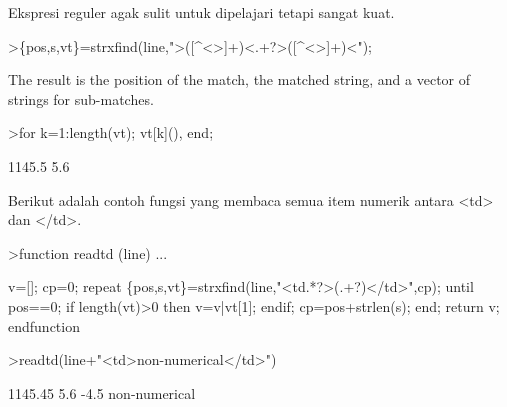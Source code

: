 \documentclass[12pt,arial,letterpaper]{book}
\begin{document}
\begin{eulercomment}
\begin{eulercomment}
\begin{eulercomment}
\begin{eulercomment}
\begin{eulercomment}
\begin{eulercomment}
\begin{eulercomment}
\begin{eulercomment}
\begin{eulercomment}
\begin{eulercomment}
\begin{eulercomment}
\begin{eulercomment}
\begin{eulercomment}
\begin{eulercomment}
\begin{eulercomment}
\begin{eulercomment}
\begin{eulercomment}
\begin{eulercomment}
\begin{eulercomment}
\begin{eulercomment}
\begin{eulercomment}
\begin{eulercomment}
\begin{eulercomment}
\begin{eulercomment}
\begin{eulercomment}
\begin{eulercomment}
\begin{eulercomment}
\begin{eulercomment}
\begin{eulercomment}
\begin{eulercomment}
\begin{eulercomment}
\begin{eulercomment}
\begin{eulercomment}
\begin{eulercomment}
\begin{eulercomment}
\begin{eulercomment}
\begin{eulercomment}
\begin{eulercomment}
\begin{eulercomment}
Ekspresi reguler agak sulit untuk dipelajari tetapi sangat kuat.
\end{eulercomment}
\begin{eulerprompt}
>\{pos,s,vt\}=strxfind(line,">([^<>]+)<.+?>([^<>]+)<");
\end{eulerprompt}
\begin{eulercomment}
The result is the position of the match, the matched string, and a
vector of strings for sub-matches.
\end{eulercomment}
\begin{eulerprompt}
>for k=1:length(vt); vt[k](), end;
\end{eulerprompt}
\begin{euleroutput}
  1145.5
  5.6
\end{euleroutput}
\begin{eulercomment}
Berikut adalah contoh fungsi yang membaca semua item numerik antara
\textless{}td\textgreater{} dan \textless{}/td\textgreater{}.
\end{eulercomment}
\begin{eulerprompt}
>function readtd (line) ...
\end{eulerprompt}
\begin{eulerudf}
  v=[]; cp=0;
  repeat
     \{pos,s,vt\}=strxfind(line,"<td.*?>(.+?)</td>",cp);
     until pos==0;
     if length(vt)>0 then v=v|vt[1]; endif;
     cp=pos+strlen(s);
  end;
  return v;
  endfunction
\end{eulerudf}
\begin{eulerprompt}
>readtd(line+"<td>non-numerical</td>")
\end{eulerprompt}
\begin{euleroutput}
  1145.45
  5.6
  -4.5
  non-numerical
\end{euleroutput}

\end{eulercomment}
\end{eulercomment}
\end{eulercomment}
\end{eulercomment}
\end{eulercomment}
\end{eulercomment}
\end{eulercomment}
\end{eulercomment}
\end{eulercomment}
\end{eulercomment}
\end{eulercomment}
\end{eulercomment}
\end{eulercomment}
\end{eulercomment}
\end{eulercomment}
\end{eulercomment}
\end{eulercomment}
\end{eulercomment}
\end{eulercomment}
\end{eulercomment}
\end{eulercomment}
\end{eulercomment}
\end{eulercomment}
\end{eulercomment}
\end{eulercomment}
\end{eulercomment}
\end{eulercomment}
\end{eulercomment}
\end{eulercomment}
\end{eulercomment}
\end{eulercomment}
\end{eulercomment}
\end{eulercomment}
\end{eulercomment}
\end{eulercomment}
\end{eulercomment}
\end{eulercomment}
\end{eulercomment}
\end{document}
